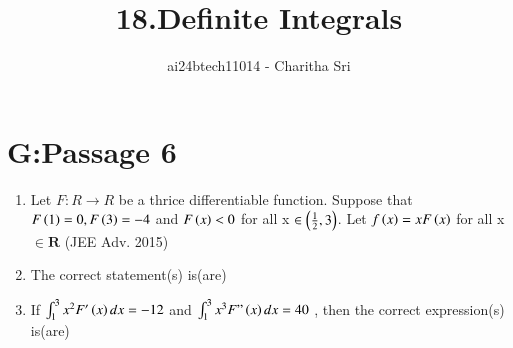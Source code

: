 \documentclass[journal,12pt,onecolumn]{IEEEtran}
\theoremstyle{remark}
\begin{document}

\vspace{3cm}

\title{18.Definite Integrals}
\author{ai24btech11014 - Charitha Sri}

\maketitle
\bigskip       
\renewcommand{\thefigure}{\theenumi}
\renewcommand{\thetable}{\theenumi}
\section{G:Passage 6}



\begin{enumerate}
 \item Let $F: R\rightarrow R$ be a thrice differentiable function. Suppose that $F\left(1\right)=0, F\left(3\right)=-4$ and $F\left(x\right)<0$ for all x $\in \left(\frac{1}{2},3\right)$. Let $f\left(x\right)=xF\left(x\right)$ for all x$\in \mathbf{R}$                        \hfill{(JEE Adv. 2015)}
\item The correct statement(s) is(are) 
 \begin{enumerate}
 \end{enumerate}

\item If $\int_{1}^{3}x^2F^\prime\left(x\right)dx=-12$ and $\int_{1}^{3}x^3F"\left(x\right)dx=40$ , then the correct expression(s) is(are) 
 \begin{enumerate}
        \end{enumerate}
\end{enumerate}
\end{document}
